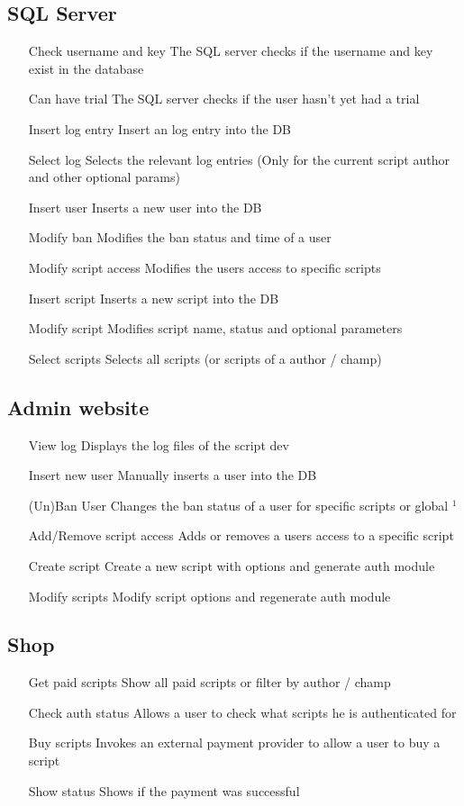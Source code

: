 \documentclass{article}
\begin{document}
\subsection{SQL Server}
\begin{itemize}
	\item[Check username and key] The SQL server checks if the username and key exist in the database
	\item[Can have trial] The SQL server checks if the user hasn't yet had a trial
	\item[Insert log entry] Insert an log entry into the DB
	\item[Select log] Selects the relevant log entries (Only for the current script author and other optional params)
	\item[Insert user] Inserts a new user into the DB
	\item[Modify ban] Modifies the ban status and time of a user
	\item[Modify script access] Modifies the users access to specific scripts
	\item[Insert script] Inserts a new script into the DB
	\item[Modify script] Modifies script name, status and optional parameters
	\item[Select scripts] Selects all scripts (or scripts of a author / champ)
\end{itemize}
\subsection{Admin website}
\begin{itemize}
	\item[View log] Displays the log files of the script dev
	\item[Insert new user] Manually inserts a user into the DB
	\item[(Un)Ban User] Changes the ban status of a user for specific scripts or global $^1$
	\item[Add/Remove script access] Adds or removes a users access to a specific script
	\item[Create script] Create a new script with options and generate auth module
	\item[Modify scripts] Modify script options and regenerate auth module
\end{itemize}
\subsection{Shop}
\begin{itemize}
	\item[Get paid scripts] Show all paid scripts or filter by author / champ
	\item[Check auth status] Allows a user to check what scripts he is authenticated for
	\item[Buy scripts] Invokes an external payment provider to allow a user to buy a script
	\item[Show status] Shows if the payment was successful
\end{itemize}
\end{document}
